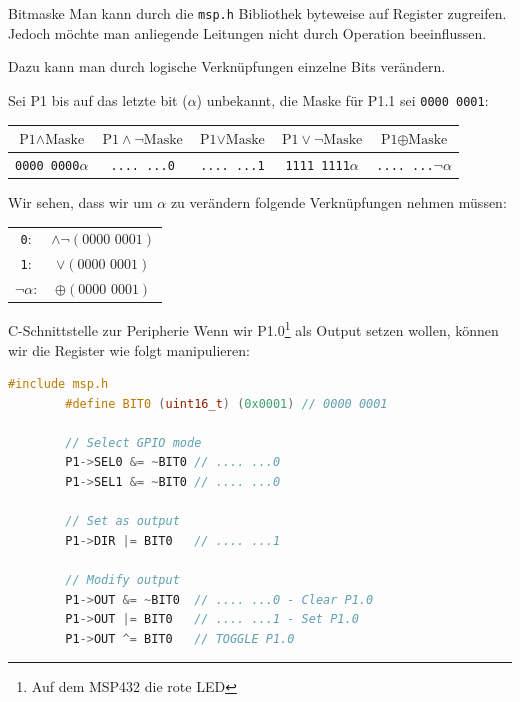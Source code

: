 \begin{bonus}{Bitmaske}
    Man kann durch die \texttt{msp.h} Bibliothek byteweise auf Register zugreifen.
    Jedoch möchte man anliegende Leitungen nicht durch Operation beeinflussen.

    Dazu kann man durch logische Verknüpfungen einzelne Bits verändern.

    Sei P1 bis auf das letzte bit (\texttt{$\alpha$}) unbekannt, die Maske für P1.1 sei \texttt{0000 0001}:

    \begin{center}
        \begin{tabular}{|c|c|c|c|c|}
            \hline
            $\text{P1} \land \text{Maske}$ & $\text{P1} \land \lnot \text{Maske}$ & $\text{P1} \lor \text{Maske}$ & $\text{P1} \lor \lnot \text{Maske}$ & $\text{P1} \oplus \text{Maske}$ \\\hline\hline
            \texttt{0000 0000$\alpha$}     & \texttt{.... ...0}                   & \texttt{.... ...1}            & \texttt{1111 1111$\alpha$}          & \texttt{.... ...$\lnot \alpha$} \\\hline
        \end{tabular}
    \end{center}

    Wir sehen, dass wir um $\alpha$ zu verändern folgende Verknüpfungen nehmen müssen:

    \begin{tabular}{cc}
        \texttt{0}:              & $\land \lnot (\text{0000 0001})$ \\
        \texttt{1}:              & $\lor (\text{0000 0001})$        \\
        \texttt{$\lnot \alpha$}: & $\oplus (\text{0000 0001})$      \\
    \end{tabular}
\end{bonus}

\begin{example}{C-Schnittstelle zur Peripherie}
    Wenn wir P1.0\footnote{Auf dem MSP432 die rote LED} als Output setzen wollen, können wir die Register wie folgt manipulieren:

    \begin{lstlisting}[language=c]
        #include msp.h
        #define BIT0 (uint16_t) (0x0001) // 0000 0001

        // Select GPIO mode
        P1->SEL0 &= ~BIT0 // .... ...0
        P1->SEL1 &= ~BIT0 // .... ...0

        // Set as output
        P1->DIR |= BIT0   // .... ...1

        // Modify output
        P1->OUT &= ~BIT0  // .... ...0 - Clear P1.0
        P1->OUT |= BIT0   // .... ...1 - Set P1.0
        P1->OUT ^= BIT0   // TOGGLE P1.0
    \end{lstlisting}
\end{example}

